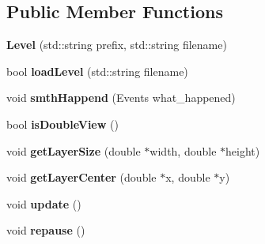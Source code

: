 \subsection*{Public Member Functions}
\begin{DoxyCompactItemize}
\item 
\mbox{\label{class_level_ae66cbb137b426e4dd1c9f0566ca04aa1}} 
{\bfseries Level} (std\+::string prefix, std\+::string filename)
\item 
\mbox{\label{class_level_a3bb921b463d085db2c9c5cb5db4f3ef9}} 
bool {\bfseries load\+Level} (std\+::string filename)
\item 
\mbox{\label{class_level_a4e898cb21d15947077dbedfb979c63be}} 
void {\bfseries smth\+Happend} (Events what\+\_\+happened)
\item 
\mbox{\label{class_level_ae3584a92caee4cf544abd2c4f946cb18}} 
bool {\bfseries is\+Double\+View} ()
\item 
\mbox{\label{class_level_a7909f2ebe4d0f676adf9c84db2c1abc8}} 
void {\bfseries get\+Layer\+Size} (double $\ast$width, double $\ast$height)
\item 
\mbox{\label{class_level_a4c49b93b4c3060fd650890790fc677e9}} 
void {\bfseries get\+Layer\+Center} (double $\ast$x, double $\ast$y)
\item 
\mbox{\label{class_level_a62e412eaad753d2baa2f94239cb80e41}} 
void {\bfseries update} ()
\item 
\mbox{\label{class_level_ab0ac8520d565a0ff6ae912baff7f1895}} 
void {\bfseries repause} ()
\end{DoxyCompactItemize}
